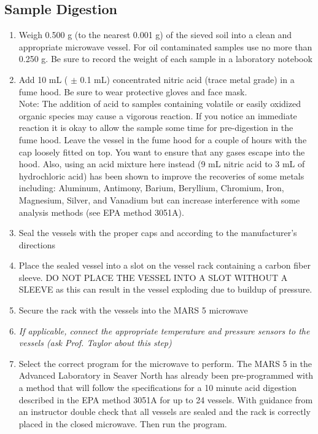 \documentclass[12pt]{../SOP3_beta}\usepackage[]{graphicx}\usepackage[]{color}
\begin{document}
\subsection{Sample Digestion}
  \begin{enumerate}
  \item	Weigh 0.500 g (to the nearest 0.001 g) of the sieved soil into a clean and appropriate microwave vessel. For oil contaminated samples use no more than 0.250 g. Be sure to record the weight of each sample in a laboratory notebook
  \item	Add 10 mL ( $\pm$ 0.1 mL) concentrated nitric acid (trace metal grade) in a fume hood. Be sure to wear protective gloves and face mask. \\ Note: The addition of acid to samples containing volatile or easily oxidized organic species may cause a vigorous reaction. If you notice an immediate reaction it is okay to allow the sample some time for pre-digestion in the fume hood. Leave the vessel in the fume hood for a couple of hours with the cap loosely fitted on top. You want to ensure that any gases escape into the hood. Also, using an acid mixture here instead (9 mL nitric acid to 3 mL of hydrochloric acid) has been shown to improve the recoveries of some metals including: Aluminum, Antimony, Barium, Beryllium, Chromium, Iron, Magnesium, Silver, and Vanadium but can increase interference with some analysis methods (see EPA method 3051A). 
  \item Seal the vessels with the proper caps and according to the manufacturer’s directions
  \item Place the sealed vessel into a slot on the vessel rack containing a carbon fiber sleeve. DO NOT PLACE THE VESSEL INTO A SLOT WITHOUT A SLEEVE as this can result in the vessel exploding due to buildup of pressure. 
  \item Secure the rack with the vessels into the MARS 5 microwave
  \item \emph{If applicable, connect the appropriate temperature and pressure sensors to the vessels (ask Prof. Taylor about this step)}
  \item Select the correct program for the microwave to perform. The MARS 5 in the Advanced Laboratory in Seaver North has already been pre-programmed with a method that will follow the specifications for a 10 minute acid digestion described in the EPA method 3051A for up to 24 vessels. With guidance from an instructor double check that all vessels are sealed and the rack is correctly placed in the closed microwave. Then run the program. \vspace{4mm} \\
  

\end{enumerate}
\end{document}
